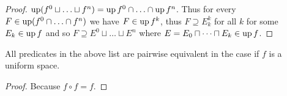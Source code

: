 \begin{proof}
$\operatorname{up}(f^{0}\sqcup\ldots\sqcup f^{n})=\operatorname{up} f^{0}\cap\ldots\cap\operatorname{up} f^{n}$.
Thus for every $F\in\operatorname{up}(f^{0}\cap\ldots\cap f^{n})$ we have $F\in\operatorname{up} f^{k}$,
thus $F\supseteq E_{k}^{k}$ for all $k$ for some $E_{k}\in\operatorname{up} f$
and so $F\supseteq E^{0}\sqcup\ldots\sqcup E^{n}$ where $E=E_{0}\sqcap\dots\sqcap E_{k}\in\operatorname{up} f$.\end{proof}
\begin{prop}
All predicates in the above list are pairwise equivalent in the case
if $f$ is a uniform space.\end{prop}
\begin{proof}
Because $f\circ f=f$.\end{proof}

